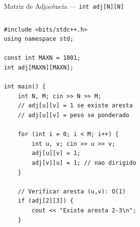 \documentclass[aspectratio=169,10pt]{beamer}
\begin{document}
\begin{frame}[fragile]{Matriz de Adjacência --- \texttt{int adj[N][N]}}
  \begin{columns}[t]
      \begin{tcolorbox}[caixaCodigo]
        \begin{lstlisting}[style=cppstyle]
#include <bits/stdc++.h>
using namespace std;

const int MAXN = 1001;
int adj[MAXN][MAXN];

int main() {
    int N, M; cin >> N >> M;
    // adj[u][v] = 1 se existe aresta
    // adj[u][v] = peso se ponderado

    for (int i = 0; i < M; i++) {
        int u, v; cin >> u >> v;
        adj[u][v] = 1;
        adj[v][u] = 1; // nao dirigido
    }

    // Verificar aresta (u,v): O(1)
    if (adj[2][3]) {
        cout << "Existe aresta 2-3\n";
    }


\end{lstlisting}
\end{tcolorbox}
\end{columns}
\end{frame}
\end{document}
